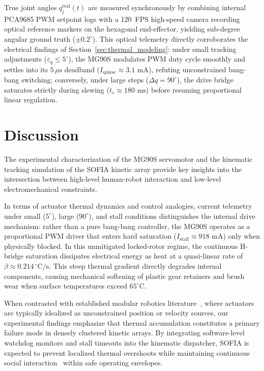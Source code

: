 \documentclass[lettersize,journal]{IEEEtran}
\begin{document}
	True joint angles $q_j^{\text{real}}(t)$ are measured synchronously by
	combining internal PCA9685 PWM setpoint logs with a 120~FPS high-speed
	camera recording optical reference markers on the hexagonal end-effector,
	yielding sub-degree angular ground truth ($\pm 0.2^\circ$). This optical
	telemetry directly corroborates the electrical findings of Section~\ref{sec:thermal_modeling}:
	under small tracking adjustments ($\varepsilon_q \le 5^\circ$), the MG90S
	modulates PWM duty cycle smoothly and settles into its $5\,\mu\text{s}$ deadband
	($I_{\text{quiesc}} \approx 3.1\text{ mA}$), refuting unconstrained bang-bang
	switching; conversely, under large steps ($\Delta q = 90^\circ$), the drive bridge
	saturates strictly during slewing ($t_s \approx 180\text{ ms}$) before resuming
	proportional linear regulation.
	
	\section{Discussion}
	\label{sec:discussion}
	
	The experimental characterization of the MG90S servomotor and the kinematic tracking simulation of the SOFIA kinetic array provide key insights into the intersection between high-level human-robot interaction and low-level electromechanical constraints.
	
	In terms of actuator thermal dynamics and control analogies, current telemetry under small ($5^\circ$), large ($90^\circ$), and stall conditions distinguishes the internal drive mechanism: rather than a pure bang-bang controller, the MG90S operates as a proportional PWM driver that enters hard saturation ($I_{\text{stall}} \approx 918\text{ mA}$) only when physically blocked. In this unmitigated locked-rotor regime, the continuous H-bridge saturation dissipates electrical energy as heat at a quasi-linear rate of $\beta \approx 0.214\,^\circ\text{C/s}$. This steep thermal gradient directly degrades internal components, causing mechanical softening of plastic gear retainers and brush wear when surface temperatures exceed $65^\circ\text{C}$.
	
	When contrasted with established modular robotics literature~\cite{seo2019modular}, where actuators are typically idealized as unconstrained position or velocity sources, our experimental findings emphasize that thermal accumulation constitutes a primary failure mode in densely clustered kinetic arrays. By integrating software-level watchdog monitors and stall timeouts into the kinematic dispatcher, SOFIA is expected to prevent localized thermal overshoots while maintaining continuous social interaction~\cite{fong2003social} within safe operating envelopes.
	
\end{document}
